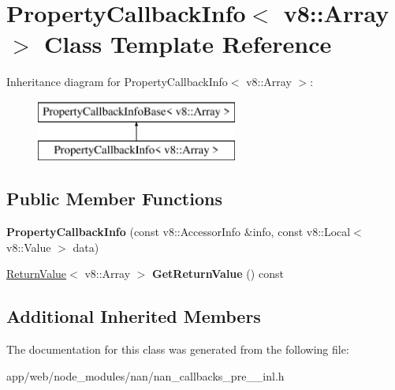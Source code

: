 \hypertarget{class_property_callback_info_3_01v8_1_1_array_01_4}{}\section{Property\+Callback\+Info$<$ v8\+:\+:Array $>$ Class Template Reference}
\label{class_property_callback_info_3_01v8_1_1_array_01_4}
Inheritance diagram for Property\+Callback\+Info$<$ v8\+:\+:Array $>$\+:\begin{figure}[H]
\begin{center}
\leavevmode
\includegraphics[height=2.000000cm]{class_property_callback_info_3_01v8_1_1_array_01_4}
\end{center}
\end{figure}
\subsection*{Public Member Functions}
\begin{DoxyCompactItemize}
\item 
\mbox{\label{class_property_callback_info_3_01v8_1_1_array_01_4_af96190de82e9783ec34b81746aa60bc6}} 
{\bfseries Property\+Callback\+Info} (const v8\+::\+Accessor\+Info \&info, const v8\+::\+Local$<$ v8\+::\+Value $>$ data)
\item 
\mbox{\label{class_property_callback_info_3_01v8_1_1_array_01_4_acdb9ac52d5d8c603e103a49e1e86a887}} 
\hyperlink{class_return_value}{Return\+Value}$<$ v8\+::\+Array $>$ {\bfseries Get\+Return\+Value} () const
\end{DoxyCompactItemize}
\subsection*{Additional Inherited Members}


The documentation for this class was generated from the following file\+:\begin{DoxyCompactItemize}
\item 
app/web/node\+\_\+modules/nan/nan\+\_\+callbacks\+\_\+pre\+\_\+\_\+inl.\+h\end{DoxyCompactItemize}
